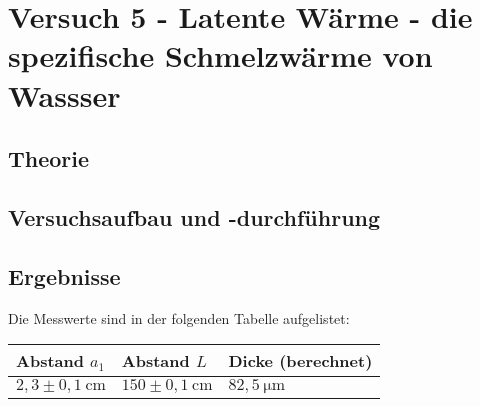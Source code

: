 \section{Versuch 5 - Latente Wärme - die spezifische Schmelzwärme von Wassser}
    \subsection{Theorie}
    \subsection{Versuchsaufbau und -durchführung}
        

    
    \subsection{Ergebnisse}

        Die Messwerte sind in der folgenden Tabelle aufgelistet:

        \begin{table}[H]
            \centering
            \begin{tabular}{|l|l|l|}
                \hline
                Abstand $a_{1}$ & Abstand $L$ & Dicke (berechnet)\\
                \hline
                $2,3 \pm 0,1\ \mathrm{cm}$ & $150 \pm 0,1\ \mathrm{cm}$ & $82,5\ \mathrm{\mu m}$\\
                \hline
            \end{tabular}
        \end{table}

